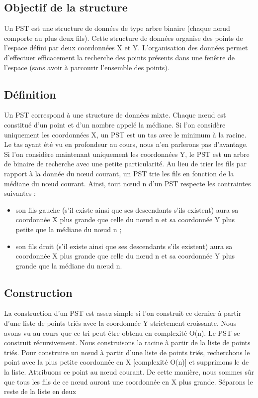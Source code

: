 \documentclass[10pt,a4paper]{article}
\begin{document}
\subsection{Objectif de la structure}
Un PST est une structure de données de type arbre binaire (chaque nœud comporte au plus deux fils). Cette structure de données organise des points de l'espace défini par deux coordonnées X et Y. L'organisation des données permet d'effectuer efficacement la recherche des points présents dans une fenêtre de l'espace (sans avoir à parcourir l'ensemble des points).

\subsection{Définition}
Un PST correspond à une structure de données mixte. Chaque nœud est constitué d'un point et d'un nombre appelé la médiane. Si l'on considère uniquement les coordonnées X, un PST est un tas avec le minimum à la racine. Le tas ayant été vu en profondeur au cours, nous n'en parlerons pas d'avantage. Si l'on considère maintenant uniquement les coordonnées Y, le PST est un arbre de binaire de recherche avec une petite particularité. Au lieu de trier les fils par rapport à la donnée du nœud courant, un PST trie les fils en fonction de la médiane du nœud courant. Ainsi, tout nœud n d'un PST respecte les contraintes suivantes :
\begin{itemize}
	\item son fils gauche (s'il existe ainsi que ses descendants s'ils existent) aura sa coordonnée X plus grande que celle du nœud n et sa coordonnée Y plus petite que la médiane du nœud n ;
	\item son fils droit (s'il existe ainsi que ses descendants s'ils existent) aura sa coordonnée X plus grande que celle du nœud n et sa coordonnée Y plus grande que la médiane du nœud n.
\end{itemize}

\subsection{Construction}
La construction d'un PST est assez simple si l'on construit ce dernier à partir d'une liste de points triés avec la coordonnée Y strictement croissante. Nous avons vu au cours que ce tri peut être obtenu en complexité O(n). Le PST se construit récursivement. Nous construisons la racine à partir de la liste de points triés. Pour construire un nœud à partir d'une liste de points triés, recherchons le point avec la plus petite coordonnée en X [complexité O(n)] et supprimons le de la liste. Attribuons ce point au nœud courant. De cette manière, nous sommes sûr que tous les fils de ce nœud auront une coordonnée en X plus grande. Séparons le reste de la liste en deux 
\end{document}
